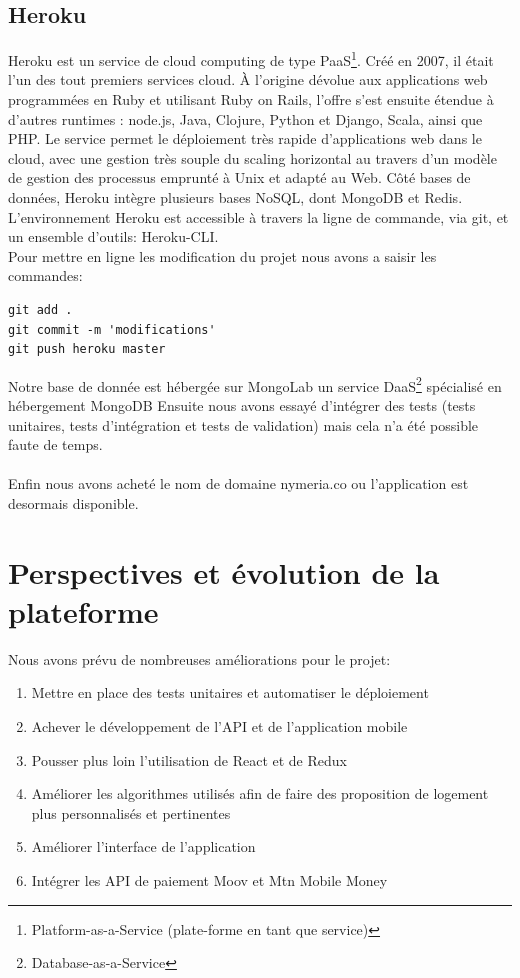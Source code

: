 \subsection{Heroku}
Heroku est un service de cloud computing de type PaaS\footnote{Platform-as-a-Service (plate-forme en tant que service)}. Créé en 2007, il était l'un des tout premiers services cloud. À l'origine dévolue aux applications web programmées en Ruby et utilisant Ruby on Rails, l'offre s'est ensuite étendue à d'autres runtimes : node.js, Java, Clojure, Python et Django, Scala, ainsi que PHP. Le service permet le déploiement très rapide d'applications web dans le cloud, avec une gestion très souple du scaling horizontal au travers d'un modèle de gestion des processus emprunté à Unix et adapté au Web. Côté bases de données, Heroku intègre plusieurs bases NoSQL, dont MongoDB et Redis.
L’environnement Heroku est accessible à travers la ligne de commande, via git, et un ensemble d'outils: Heroku-CLI.\\
Pour mettre en ligne les modification du projet nous avons a saisir les commandes:
\begin{lstlisting}
git add .
git commit -m 'modifications'
git push heroku master
\end{lstlisting}
Notre base de donnée est hébergée sur MongoLab un service DaaS\footnote{Database-as-a-Service}
spécialisé en hébergement MongoDB 
Ensuite nous avons essayé d'intégrer des tests (tests unitaires, tests d'intégration et tests de validation) mais cela n’a été possible faute de temps.
\\\\
Enfin nous avons acheté le nom de domaine nymeria.co ou l'application est desormais disponible.

\section{Perspectives et évolution de la plateforme}
Nous avons prévu de nombreuses améliorations pour le projet:
\begin{enumerate}
	\item Mettre en place des tests unitaires et automatiser le déploiement
	\item Achever le développement de l’API et de l'application mobile
	\item Pousser plus loin l’utilisation de React et de Redux
	\item Améliorer les algorithmes utilisés afin de faire des proposition de logement plus personnalisés et pertinentes
	\item Améliorer l’interface de l'application
	\item Intégrer les API de paiement Moov et Mtn Mobile Money
\end{enumerate}
